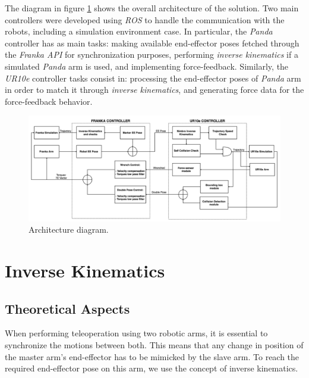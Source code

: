 \documentclass[runningheads]{llncs}
\begin{document}
The diagram in figure \ref{fig:architecture_diagram} shows the overall architecture of the solution. Two main controllers were developed using \textit{ROS} to handle the communication with the robots, including a simulation environment case. In particular, the \textit{Panda} controller has as main tasks: making available end-effector poses fetched through the \textit{Franka API} for synchronization purposes, performing \textit{inverse kinematics} if a simulated \textit{Panda} arm is used, and implementing force-feedback. Similarly, the \textit{UR10e} controller tasks consist in: processing the end-effector poses of \textit{Panda} arm in order to match it through \textit{inverse kinematics}, and generating force data for the force-feedback behavior.

\begin{figure}[h]
	\begin{center}
		\includegraphics[width=\linewidth]{figures/code-architecture.png}
	\end{center}
	\caption{Architecture diagram.}
	\label{fig:architecture_diagram}
\end{figure}

\section{Inverse Kinematics}
\label{section:ik}

\subsection{Theoretical Aspects}
When performing teleoperation using two robotic arms, it is essential to synchronize the motions between both. This means that any change in position of the master arm's end-effector has to be mimicked by the slave arm. To reach the required end-effector pose on this arm, we use the concept of inverse kinematics.

\end{document}
